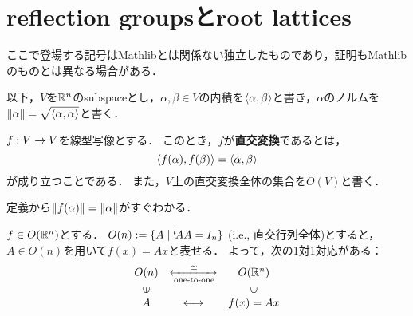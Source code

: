 %

\section{reflection groupsとroot lattices}
ここで登場する記号はMathlibとは関係ない独立したものであり，証明もMathlibのものとは異なる場合がある．

以下，$V$を$\mathbb{R}^n$のsubspaceとし，$\alpha, \beta \in V$の内積を$\left\langle \alpha, \beta \right\rangle$と書き，$\alpha$のノルムを$\left\| \alpha \right\| = \sqrt{\left\langle \alpha, \alpha \right\rangle}$と書く．
\begin{defi}
  \label{defi:orthogonal_transformation}
  $f : V \rightarrow V$を線型写像とする．
  このとき，$f$が\textbf{直交変換}であるとは，
  \begin{equation}
    \left\langle f(\alpha), f(\beta) \right\rangle = \left\langle \alpha, \beta \right\rangle
  \end{equation}
  が成り立つことである．
  また，$V$上の直交変換全体の集合を$O(V)$と書く．
\end{defi}

\begin{rem}
  \label{rem:orthogonal_transformation_norm}
  \leanok
  定義から$\left\| f(\alpha) \right\| = \left\| \alpha \right\|$がすぐわかる．
\end{rem}

\begin{rem}
  \label{rem:orthogonal_transformation_one-to-one}
  $f \in O(\mathbb{R}^n)$とする．
  $O(n) := \left\lbrace A \mathrel{} \middle| \mathrel{} {}^t\!A A = I_n \right\rbrace$ (i.e., 直交行列全体)とすると，$A \in O(n)$を用いて$f(x) = Ax$と表せる．
  よって，次の1対1対応がある：
  \begin{equation}
    \begin{array}{ccc}
    O(n) & \xleftrightarrow[\text{one-to-one}]{\simeq}  & O(\R^n) \\
    \rotatebox[origin=c]{90}{$\in$} & & \rotatebox[origin=c]{90}{$\in$} \\
    A & \longleftrightarrow & f(x) = Ax
    \end{array}
  \end{equation}
\end{rem}

